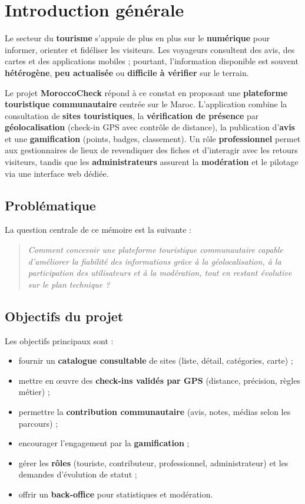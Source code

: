 \chapter*{Introduction générale}

Le secteur du \textbf{tourisme} s'appuie de plus en plus sur le \textbf{numérique} pour informer, orienter et fidéliser les visiteurs. Les voyageurs consultent des avis, des cartes et des applications mobiles ; pourtant, l'information disponible est souvent \textbf{hétérogène}, \textbf{peu actualisée} ou \textbf{difficile à vérifier} sur le terrain.

Le projet \textbf{MoroccoCheck} répond à ce constat en proposant une \textbf{plateforme touristique communautaire} centrée sur le Maroc. L'application combine la consultation de \textbf{sites touristiques}, la \textbf{vérification de présence} par \textbf{géolocalisation} (check-in GPS avec contrôle de distance), la publication d'\textbf{avis} et une \textbf{gamification} (points, badges, classement). Un rôle \textbf{professionnel} permet aux gestionnaires de lieux de revendiquer des fiches et d'interagir avec les retours visiteurs, tandis que les \textbf{administrateurs} assurent la \textbf{modération} et le pilotage via une interface web dédiée.

\section{Problématique}

La question centrale de ce mémoire est la suivante :

\begin{quote}
\textit{Comment concevoir une plateforme touristique communautaire capable d'améliorer la fiabilité des informations grâce à la géolocalisation, à la participation des utilisateurs et à la modération, tout en restant évolutive sur le plan technique ?}
\end{quote}

\section{Objectifs du projet}

Les objectifs principaux sont :
\begin{itemize}[leftmargin=*]
  \item fournir un \textbf{catalogue consultable} de sites (liste, détail, catégories, carte) ;
  \item mettre en œuvre des \textbf{check-ins validés par GPS} (distance, précision, règles métier) ;
  \item permettre la \textbf{contribution communautaire} (avis, notes, médias selon les parcours) ;
  \item encourager l'engagement par la \textbf{gamification} ;
  \item gérer les \textbf{rôles} (touriste, contributeur, professionnel, administrateur) et les demandes d'évolution de statut ;
  \item offrir un \textbf{back-office} pour statistiques et modération.
\end{itemize}

